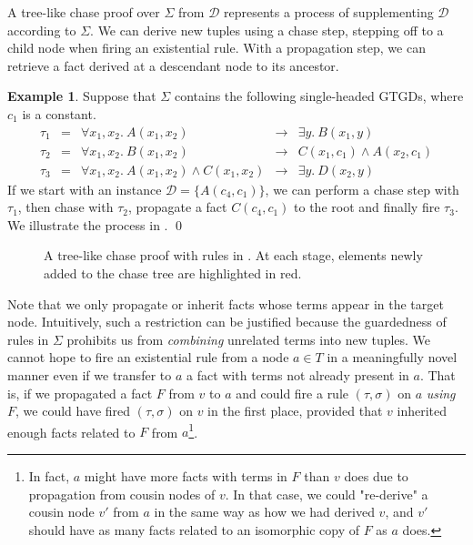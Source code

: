 \documentclass[12pt]{report}
\theoremstyle{plain}
\theoremstyle{definition}
\newtheorem{example}[theorem]{Example}
\begin{document}
A tree-like chase proof over $\Sigma$ from $\mathcal{D}$ represents a process of supplementing $\mathcal{D}$ according to $\Sigma$. We can derive new tuples using a chase step, stepping off to a child node when firing an existential rule. With a propagation step, we can retrieve a fact derived at a descendant node to its ancestor.

\begin{example}
\label{tree-like-chase-proof-example}
  Suppose that $\Sigma$ contains the following single-headed GTGDs, where $c_1$ is a constant.
  \[\begin{array}{rcrcl}
    \tau_1 &=& \forall x_1,x_2.\ A(x_1, x_2) &\rightarrow& \exists y.\ B(x_1, y) \\
    \tau_2 &=& \forall x_1,x_2.\ B(x_1, x_2) &\rightarrow& C(x_1, c_1) \wedge A(x_2, c_1) \\
    \tau_3 &=& \forall x_1,x_2.\ A(x_1, x_2) \wedge C(x_1, x_2) &\rightarrow& \exists y.\ D(x_2, y)
  \end{array}\]
  If we start with an instance $\mathcal{D} = \{A(c_4, c_1)\}$, we can perform a chase step with $\tau_1$, then chase with $\tau_2$, propagate a fact $C(c_4, c_1)$ to the root and finally fire $\tau_3$. We illustrate the process in .
  \qed
\end{example}

\begin{figure}[t]
  \centering
  
  \caption{A tree-like chase proof with rules in . At each stage, elements newly added to the chase tree are highlighted in red.}
  \label{tree-like-chase-proof-example-diagram}
\end{figure}

Note that we only propagate or inherit facts whose terms appear in the target node. Intuitively, such a restriction can be justified because the guardedness of rules in $\Sigma$ prohibits us from \emph{combining} unrelated terms into new tuples. We cannot hope to fire an existential rule from a node $a \in T$ in a meaningfully novel manner even if we transfer to $a$ a fact with terms not already present in $a$. That is, if we propagated a fact $F$ from $v$ to $a$ and could fire a rule $(\tau, \sigma)$ on $a$ \emph{using} $F$, we could have fired $(\tau, \sigma)$ on $v$ in the first place, provided that $v$ inherited enough facts related to $F$ from $a$\footnote{In fact, $a$ might have more facts with terms in $F$ than $v$ does due to propagation from cousin nodes of $v$. In that case, we could "re-derive" a cousin node $v'$ from $a$ in the same way as how we had derived $v$, and $v'$ should have as many facts related to an isomorphic copy of $F$ as $a$ does.}.
\end{document}
